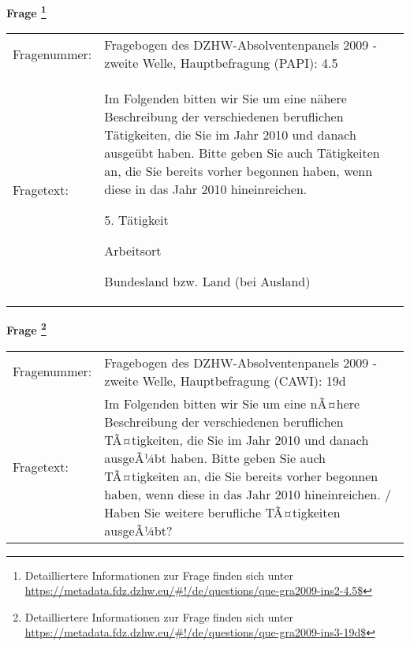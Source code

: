 				\vspace*{0.5cm}
                \noindent\textbf{Frage
	                \footnote{Detailliertere Informationen zur Frage finden sich unter
		              \url{https://metadata.fdz.dzhw.eu/\#!/de/questions/que-gra2009-ins2-4.5$}}}\\
				\begin{tabularx}{\hsize}{@{}lX}
					Fragenummer: &
					  Fragebogen des DZHW-Absolventenpanels 2009 - zweite Welle, Hauptbefragung (PAPI):
					  4.5
 \\
					Fragetext: & Im Folgenden bitten wir Sie um eine nähere Beschreibung der verschiedenen beruflichen Tätigkeiten, die Sie im Jahr 2010 und danach ausgeübt haben. Bitte geben Sie auch Tätigkeiten an, die Sie bereits vorher begonnen haben, wenn diese in das Jahr 2010 hineinreichen.\par  5. Tätigkeit\par  Arbeitsort\par  Bundesland bzw. Land (bei Ausland) \\
				\end{tabularx}
				\vspace*{0.5cm}
                \noindent\textbf{Frage
	                \footnote{Detailliertere Informationen zur Frage finden sich unter
		              \url{https://metadata.fdz.dzhw.eu/\#!/de/questions/que-gra2009-ins3-19d$}}}\\
				\begin{tabularx}{\hsize}{@{}lX}
					Fragenummer: &
					  Fragebogen des DZHW-Absolventenpanels 2009 - zweite Welle, Hauptbefragung (CAWI):
					  19d
 \\
					Fragetext: & Im Folgenden bitten wir Sie um eine nÃ¤here Beschreibung der verschiedenen beruflichen TÃ¤tigkeiten, die Sie im Jahr 2010 und danach ausgeÃ¼bt haben. Bitte geben Sie auch TÃ¤tigkeiten an, die Sie bereits vorher begonnen haben, wenn diese in das Jahr 2010 hineinreichen. / Haben Sie weitere berufliche TÃ¤tigkeiten ausgeÃ¼bt? \\
				\end{tabularx}





